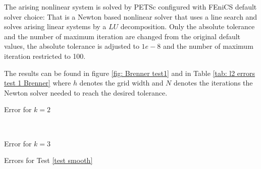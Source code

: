 The arising nonlinear system is solved by PETSc configured with FEniCS default solver choice: That is a Newton based nonlinear solver that uses a line search and solves arising linear systems by a $LU$ decomposition.
Only the absolute tolerance and the number of maximum iteration are changed from the original default values, the absolute tolerance is adjusted to $1e-8$ and the number of maximum iteration restricted to 100. 

The results can be found in figure \ref{fig: Brenner test1} and in Table \ref{tab: l2 errors test 1 Brenner} where $h$ denotes the grid width and $N$ denotes the iterations the Newton solver needed to reach the desired tolerance. 

\begin{table}[H]
	\begin{subtable}[b]{0.45\textwidth}
		\centering
		\pgfplotstabletypeset[columns={iterations, l2error, h1error,N},
				    every row 0 column 0/.style={set content=init},
		]\MAOneBrennerTwo
    	\caption{Error for $k=2$}
   \end{subtable}
   ~
	\begin{subtable}[b]{0.45\textwidth}
		\centering
		\pgfplotstabletypeset[columns={iterations, l2error, h1error,N},
				    every row 0 column 0/.style={set content=init},
		]\MAOneBrennerThree
 	\caption{Error for $k=3$}
	\end{subtable}
	\caption{Errors for Test \ref{test smooth}}
	\label{tab: l2 errors test 1 Brenner}
\end{table}

